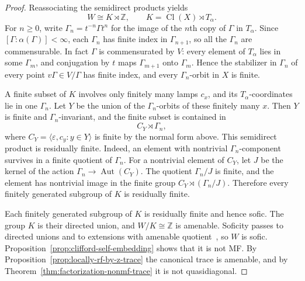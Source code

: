 \documentclass[11pt]{amsart}
\newcommand{\leanverified}[2]{\ignorespaces}
\theoremstyle{plain}
\begin{document}
\begin{proof}
Reassociating the semidirect products yields
\leanverified{Sofic/CliffordWitnessLocallyRFByInt}{GroupApproximation.CliffordWitnessLocallyRFByInt.manuscriptAmbientEquivShiftKernelForByInt}
\[
 W\cong K\rtimes\mathbb Z,
 \qquad K=\operatorname{Cl}(X)\rtimes T_\alpha.
\]
For $n\ge0$, write $\Gamma_n=t^{-n}\Gamma t^n$ for the image of the $n$th
copy of $\Gamma$ in $T_\alpha$.  Since $[\Gamma:\alpha(\Gamma)]<\infty$,
each $\Gamma_n$ has finite index in $\Gamma_{n+1}$, so all the $\Gamma_n$
are commensurable.  In fact $\Gamma$ is commensurated by $V$: every
element of $T_\alpha$ lies in some $\Gamma_m$, and conjugation by $t$
maps $\Gamma_{m+1}$ onto $\Gamma_m$.  Hence the stabilizer in $\Gamma_n$ of every point
$v\Gamma\in V/\Gamma$ has finite index, and every $\Gamma_n$-orbit in $X$
is finite.

A finite subset of $K$ involves only finitely many lamps $c_x$, and its
$T_\alpha$-coordinates lie in one $\Gamma_n$.  Let $Y$ be the union of
the $\Gamma_n$-orbits of these finitely many $x$.  Then $Y$ is finite
and $\Gamma_n$-invariant, and the finite subset is contained in
\[
 C_Y\rtimes\Gamma_n,
\]
where $C_Y=\langle\varepsilon,c_y:y\in Y\rangle$ is finite by the
normal form above.  This semidirect product is
residually finite.  Indeed, an element with nontrivial $\Gamma_n$-component
survives in a finite quotient of $\Gamma_n$.  For a nontrivial element of
$C_Y$, let $J$ be the kernel of the action
$\Gamma_n\to\operatorname{Aut}(C_Y)$.  The quotient $\Gamma_n/J$ is finite,
and the element has nontrivial image in the finite group
$C_Y\rtimes(\Gamma_n/J)$.  Therefore every finitely generated subgroup of $K$ is residually
finite.
\leanverified{Sofic/CliffordWitnessLocallyRFByInt}{GroupApproximation.CliffordWitnessLocallyRFByInt.manuscriptShiftKernelForIsLocallyResiduallyFinite}

Each finitely generated subgroup of $K$ is residually finite and hence
sofic.  The group $K$ is their directed union, and $W/K\cong\mathbb Z$
is amenable.  Soficity passes to directed unions and to extensions with
amenable quotient~\cite[Theorem~1]{ElekSzabo}, so $W$ is sofic.
Proposition~\ref{prop:clifford-self-embedding} shows that it is not MF.
By Proposition~\ref{prop:locally-rf-by-z-trace} the canonical trace is
amenable, and by Theorem~\ref{thm:factorization-nonmf-trace} it is not
quasidiagonal.
\end{proof}
\end{document}
